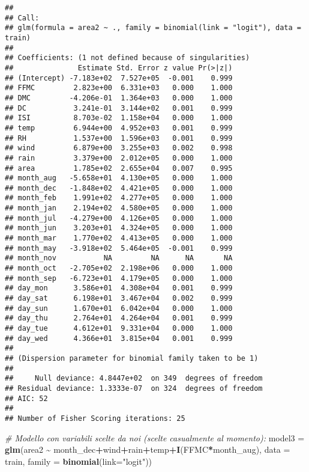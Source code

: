 \documentclass[
]{article}
\newenvironment{Shaded}{\begin{snugshade}}{\end{snugshade}}
\newcommand{\AttributeTok}[1]{\textcolor[rgb]{0.13,0.29,0.53}{#1}}
\newcommand{\CommentTok}[1]{\textcolor[rgb]{0.56,0.35,0.01}{\textit{#1}}}
\newcommand{\FunctionTok}[1]{\textcolor[rgb]{0.13,0.29,0.53}{\textbf{#1}}}
\newcommand{\NormalTok}[1]{#1}
\newcommand{\OtherTok}[1]{\textcolor[rgb]{0.56,0.35,0.01}{#1}}
\newcommand{\SpecialCharTok}[1]{\textcolor[rgb]{0.81,0.36,0.00}{\textbf{#1}}}
\newcommand{\StringTok}[1]{\textcolor[rgb]{0.31,0.60,0.02}{#1}}
\begin{document}
\begin{verbatim}
## 
## Call:
## glm(formula = area2 ~ ., family = binomial(link = "logit"), data = train)
## 
## Coefficients: (1 not defined because of singularities)
##               Estimate Std. Error z value Pr(>|z|)
## (Intercept) -7.183e+02  7.527e+05  -0.001    0.999
## FFMC         2.823e+00  6.331e+03   0.000    1.000
## DMC         -4.206e-01  1.364e+03   0.000    1.000
## DC           3.241e-01  3.144e+02   0.001    0.999
## ISI          8.703e-02  1.158e+04   0.000    1.000
## temp         6.944e+00  4.952e+03   0.001    0.999
## RH           1.537e+00  1.596e+03   0.001    0.999
## wind         6.879e+00  3.255e+03   0.002    0.998
## rain         3.379e+00  2.012e+05   0.000    1.000
## area         1.785e+02  2.655e+04   0.007    0.995
## month_aug   -5.658e+01  4.130e+05   0.000    1.000
## month_dec   -1.848e+02  4.421e+05   0.000    1.000
## month_feb    1.991e+02  4.277e+05   0.000    1.000
## month_jan    2.194e+02  4.580e+05   0.000    1.000
## month_jul   -4.279e+00  4.126e+05   0.000    1.000
## month_jun    3.203e+01  4.324e+05   0.000    1.000
## month_mar    1.770e+02  4.413e+05   0.000    1.000
## month_may   -3.918e+02  5.464e+05  -0.001    0.999
## month_nov           NA         NA      NA       NA
## month_oct   -2.705e+02  2.198e+06   0.000    1.000
## month_sep   -6.723e+01  4.179e+05   0.000    1.000
## day_mon      3.586e+01  4.308e+04   0.001    0.999
## day_sat      6.198e+01  3.467e+04   0.002    0.999
## day_sun      1.670e+01  6.042e+04   0.000    1.000
## day_thu      2.764e+01  4.264e+04   0.001    0.999
## day_tue      4.612e+01  9.331e+04   0.000    1.000
## day_wed      4.366e+01  3.815e+04   0.001    0.999
## 
## (Dispersion parameter for binomial family taken to be 1)
## 
##     Null deviance: 4.8447e+02  on 349  degrees of freedom
## Residual deviance: 1.3333e-07  on 324  degrees of freedom
## AIC: 52
## 
## Number of Fisher Scoring iterations: 25
\end{verbatim}

\begin{Shaded}
\begin{Highlighting}[]
\CommentTok{\# Modello con variabili scelte da noi (scelte casualmente al momento):}
\NormalTok{model3 }\OtherTok{=} \FunctionTok{glm}\NormalTok{(area2 }\SpecialCharTok{\textasciitilde{}}\NormalTok{ month\_dec}\SpecialCharTok{+}\NormalTok{wind}\SpecialCharTok{+}\NormalTok{rain}\SpecialCharTok{+}\NormalTok{temp}\SpecialCharTok{+}\FunctionTok{I}\NormalTok{(FFMC}\SpecialCharTok{*}\NormalTok{month\_aug), }\AttributeTok{data =}\NormalTok{ train, }\AttributeTok{family =} \FunctionTok{binomial}\NormalTok{(}\AttributeTok{link=}\StringTok{"logit"}\NormalTok{))}
\end{Highlighting}
\end{Shaded}
\end{document}
